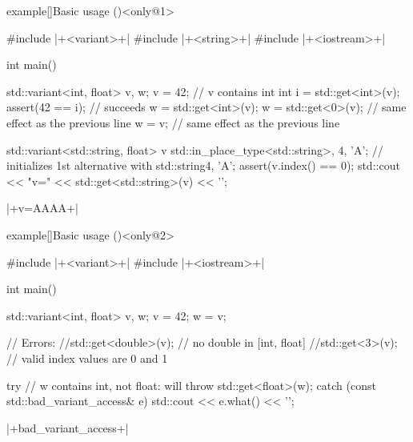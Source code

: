 \begin{frame}[fragile]{}
    \begin{varblock}{example}[\textwidth]{Basic usage (\overlaynumber)}<only@1>
        \begin{Cpp}
            #include |+<variant>+|
            #include |+<string>+|
            #include |+<iostream>+|

            int main()
            {
                std::variant<int, float> v, w;
                v = 42; // v contains int
                int i = std::get<int>(v);
                assert(42 == i); // succeeds
                w = std::get<int>(v);
                w = std::get<0>(v); // same effect as the previous line
                w = v;              // same effect as the previous line

                std::variant<std::string, float> v{
                    std::in_place_type<std::string>, 4, 'A'};
                // initializes 1st alternative with std::string{4, 'A'};
                assert(v.index() == 0);
                std::cout << "v=" << std::get<std::string>(v) << '\n';
            }
        \end{Cpp}
        \begin{Bash}[numbers=none]
            |+v=AAAA+|
        \end{Bash}
    \end{varblock}
    \begin{varblock}{example}[\textwidth]{Basic usage (\overlaynumber)}<only@2>
        \begin{Cpp}
            #include |+<variant>+|
            #include |+<iostream>+|

            int main()
            {
                std::variant<int, float> v, w;
                v = 42;
                w = v;

                // Errors:
                //std::get<double>(v); // no double in [int, float]
                //std::get<3>(v);      // valid index values are 0 and 1

                try {
                    // w contains int, not float: will throw
                    std::get<float>(w);
                }
                catch (const std::bad_variant_access& e) {
                    std::cout << e.what() << '\n';
                }
            }
        \end{Cpp}
        \begin{Bash}[numbers=none]
            |+bad_variant_access+|
        \end{Bash}
    \end{varblock}
\end{frame}

